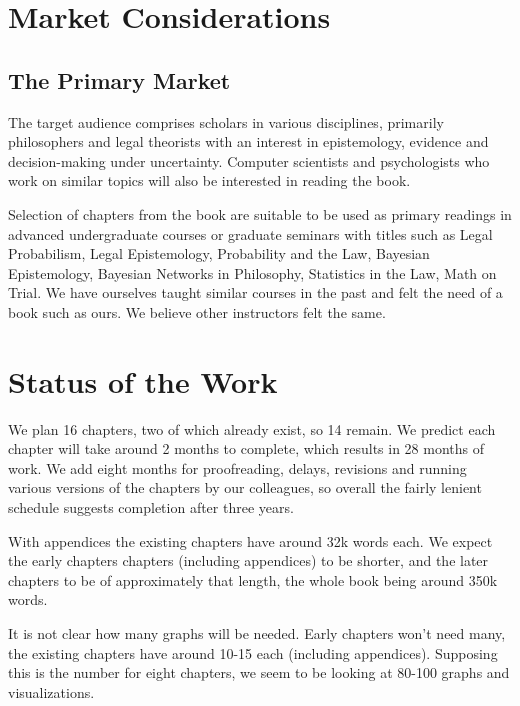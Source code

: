 \documentclass[
  10pt,
  dvipsnames,enabledeprecatedfontcommands]{scrartcl}
\begin{document}
\hypertarget{market-considerations}{%
\section{Market Considerations}\label{market-considerations}}

\hypertarget{the-primary-market}{%
\subsection{The Primary Market}\label{the-primary-market}}

\normalsize

The target audience comprises scholars in various disciplines, primarily
philosophers and legal theorists with an interest in epistemology,
evidence and decision-making under uncertainty. Computer scientists and
psychologists who work on similar topics will also be interested in
reading the book.

Selection of chapters from the book are suitable to be used as primary
readings in advanced undergraduate courses or graduate seminars with
titles such as Legal Probabilism, Legal Epistemology, Probability and
the Law, Bayesian Epistemology, Bayesian Networks in Philosophy,
Statistics in the Law, Math on Trial. We have ourselves taught similar
courses in the past and felt the need of a book such as ours. We believe
other instructors felt the same.

\hypertarget{status-of-the-work}{%
\section{Status of the Work}\label{status-of-the-work}}

We plan 16 chapters, two of which already exist, so 14 remain. We
predict each chapter will take around 2 months to complete, which
results in 28 months of work. We add eight months for proofreading,
delays, revisions and running various versions of the chapters by our
colleagues, so overall the fairly lenient schedule suggests completion
after three years.

With appendices the existing chapters have around 32k words each. We
expect the early chapters chapters (including appendices) to be shorter,
and the later chapters to be of approximately that length, the whole
book being around 350k words.

It is not clear how many graphs will be needed. Early chapters won't
need many, the existing chapters have around 10-15 each (including
appendices). Supposing this is the number for eight chapters, we seem to
be looking at 80-100 graphs and visualizations.
\end{document}
